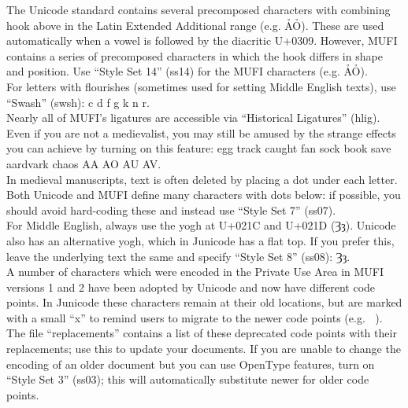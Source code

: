 \documentclass[a4paper]{article}
\begin{document}
 The Unicode standard
contains several precomposed characters with combining hook above in
the Latin Extended Additional range (e.g. ẢỎ). These are used
automatically when a vowel is followed by the diacritic
U+0309. However, MUFI contains a series of precomposed characters in
which the hook differs in shape and position. Use “Style Set 14”
(ss14) for the MUFI characters (e.g.
ẢỎ).\\

For letters with flourishes (sometimes used for setting Middle English
texts), use “Swash” (swsh):
{c d f g k n r}.\\

  Nearly all of MUFI’s ligatures are
accessible via “Historical Ligatures” (hlig).
{Even if you are not a medievalist,
  you may still be amused by the strange effects you can achieve by
  turning on this feature: egg track caught fan sock book save aardvark
  chaos AA AO
  AU AV.}\\

In medieval manuscripts, text is often deleted by placing a dot under each
letter. Both Unicode and MUFI define many characters with dots below:
{ if possible, you should avoid
hard-coding these and instead use} “Style Set 7” (ss07).\\

For Middle English, always use the yogh at U+021C and U+021D (Ȝȝ).
Unicode also has an alternative yogh, which in Junicode has a
flat top. If you prefer this, leave the underlying text the same and
specify “Style Set 8” (ss08):
{ Ȝȝ}.\\

 A number of characters
which were encoded in the Private Use Area in MUFI versions 1 and 2
have been adopted by Unicode and now have different code points. In
Junicode these characters remain at their old locations, but are
marked with a small “x” to remind users to migrate to the newer code
points (e.g. ). The file “replacements” contains a list of these
deprecated code points with their replacements; use this to update
your documents. If you are unable to change the encoding of an older
document but you can use OpenType features, turn on “Style Set 3”
(ss03); this will automatically substitute newer for older code
points.\\
\end{document}
